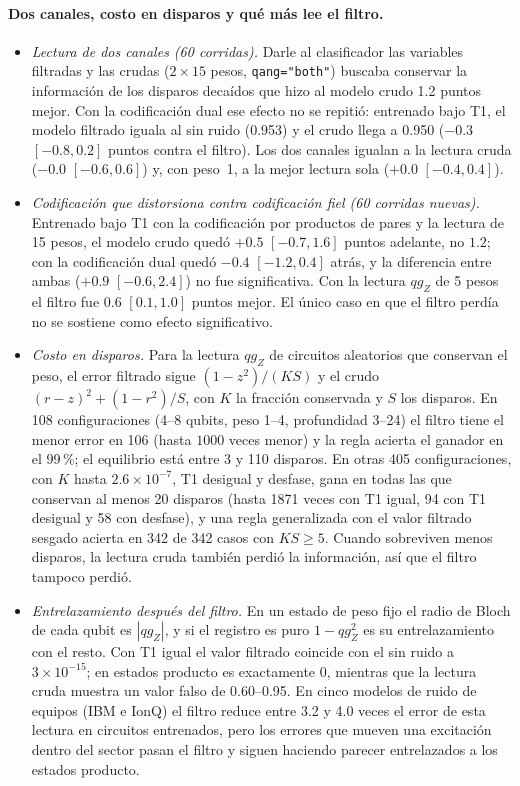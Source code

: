 \documentclass[11pt]{article}
\newcommand{\qZ}{qg_Z}
\begin{document}
\paragraph{Dos canales, costo en disparos y qué más lee el filtro.}\label{sec:escala}
\begin{itemize}
\item \textit{Lectura de dos canales (60 corridas).} Darle al clasificador las variables filtradas y las crudas
  ($2\times15$ pesos, \texttt{qang="both"}) buscaba conservar la información de los disparos decaídos que hizo al
  modelo crudo 1.2 puntos mejor. Con la codificación dual ese efecto no se repitió: entrenado bajo T1, el modelo
  filtrado iguala al sin ruido (0.953) y el crudo llega a 0.950 ($-0.3$ $[-0.8,0.2]$ puntos contra el filtro). Los
  dos canales igualan a la lectura cruda ($-0.0$ $[-0.6,0.6]$) y, con peso~1, a la mejor lectura sola ($+0.0$
  $[-0.4,0.4]$).
\item \textit{Codificación que distorsiona contra codificación fiel (60 corridas nuevas).} Entrenado bajo T1 con la
  codificación por productos de pares y la lectura de 15 pesos, el modelo crudo quedó $+0.5$ $[-0.7,1.6]$ puntos
  adelante, no $1.2$; con la codificación dual quedó $-0.4$ $[-1.2,0.4]$ atrás, y la diferencia entre ambas
  ($+0.9$ $[-0.6,2.4]$) no fue significativa. Con la lectura $\qZ$ de 5 pesos el filtro fue $0.6$ $[0.1,1.0]$ puntos
  mejor. El único caso en que el filtro perdía no se sostiene como efecto significativo.
\item \textit{Costo en disparos.} Para la lectura $\qZ$ de circuitos aleatorios que conservan el peso, el error
  filtrado sigue $(1-z^2)/(KS)$ y el crudo $(r-z)^2+(1-r^2)/S$, con $K$ la fracción conservada y $S$ los disparos. En
  108 configuraciones (4--8 qubits, peso 1--4, profundidad 3--24) el filtro tiene el menor error en 106 (hasta
  $1000$ veces menor) y la regla acierta el ganador en el 99\,\%; el equilibrio está entre 3 y 110 disparos. En otras
  405 configuraciones, con $K$ hasta $2.6\times10^{-7}$, T1 desigual y desfase, gana en todas las que conservan al
  menos 20 disparos (hasta 1871 veces con T1 igual, 94 con T1 desigual y 58 con desfase), y una regla generalizada
  con el valor filtrado sesgado acierta en 342 de 342 casos con $KS\ge5$. Cuando sobreviven menos disparos, la
  lectura cruda también perdió la información, así que el filtro tampoco perdió.
\item \textit{Entrelazamiento después del filtro.} En un estado de peso fijo el radio de Bloch de cada qubit es
  $|\qZ|$, y si el registro es puro $1-\qZ^2$ es su entrelazamiento con el resto. Con T1 igual el valor filtrado
  coincide con el sin ruido a $3\times10^{-15}$; en estados producto es exactamente 0, mientras que la lectura cruda
  muestra un valor falso de 0.60--0.95. En cinco modelos de ruido de equipos (IBM e IonQ) el filtro reduce entre 3.2
  y 4.0 veces el error de esta lectura en circuitos entrenados, pero los errores que mueven una excitación dentro del
  sector pasan el filtro y siguen haciendo parecer entrelazados a los estados producto.
\end{itemize}
\end{document}
